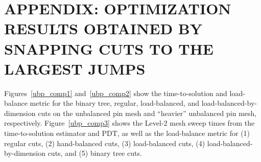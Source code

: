 %
%
%
%



\chapter{\uppercase{Appendix: Optimization Results Obtained by snapping cuts to the largest jumps }}\label{appendix1}

Figures~\ref{ubp_comp1} and~\ref{ubp_comp2} show the time-to-solution and load-balance metric for the binary tree, regular, load-balanced, and load-balanced-by-dimension cuts on the unbalanced pin mesh and ``heavier'' unbalanced pin mesh, respectively.
Figure~\ref{ubp_comp3} shows the Level-2 mesh sweep times from the time-to-solution estimator and PDT, as well as the load-balance metric for (1) regular cuts, (2) hand-balanced cuts, (3) load-balanced cuts, (4) load-balanced-by-dimension cuts, and (5) binary tree cuts.


